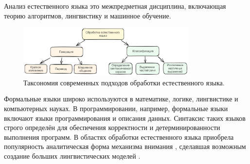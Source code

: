 Анализ естественного языка это межпредметная дисциплина, включающая теорию алгоритмов, 
лингвистику и машинное обучение.

\begin{figure}[h]
    \centering
    \includegraphics[width=0.8\textwidth]{assets/ml/nlp/taxonomy.excalidraw.png}
    \caption{Таксономия современных подходов обработки естественного языка.}
    \label{llm_taxonomy}
\end{figure}

Формальные языки широко используются в математике, логике, лингвистике и компьютерных науках. 
В программировании, например, формальные языки включают языки программирования и описания данных. 
Синтаксис таких языков строго определён для обеспечения корректности и детерминированности выполнения программ.
В областях обработки естественного языка приобрела популярность аналитическая форма механизма внимания \cite{vaswani2017attention},
сделавшая возможным создание больших лингвистических моделей \cite{radford2019language}.

